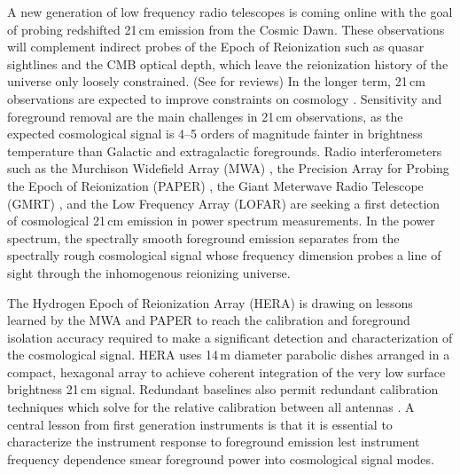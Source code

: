 A new generation of low frequency radio telescopes is coming online with the goal of
 probing redshifted 21\,cm emission from the Cosmic Dawn. These observations will 
 complement indirect probes of the Epoch of Reionization such as quasar 
 sightlines and the CMB optical depth, which leave the reionization 
 history of the universe only loosely constrained. (See \citet{FurlanettoReview, miguelreview, PritchardLoebReview, aviBook, zaroubi} for reviews) In the longer term, 21\,cm observations are expected to improve constraints on cosmology \citep[e.g.,][]{mao08, liu15a,liu15b}. Sensitivity and foreground removal are 
 the main challenges in 21\,cm observations, as the expected cosmological signal is 4--5 
 orders of magnitude fainter in brightness temperature than Galactic and extragalactic foregrounds. Radio 
 interferometers such as the Murchison Widefield Array (MWA) \citep{lonsdale09,tingay13,mwascience}, the Precision Array for Probing the Epoch of Reionization (PAPER) \citep{parsons10,parsons14,ali15}, the Giant Meterwave Radio Telescope (GMRT) 
 \citep{Paciga2011}, and the Low Frequency Array (LOFAR) \citep{lofar} are seeking a first detection of 
 cosmological 21\,cm emission in power spectrum measurements. In the power spectrum, the spectrally smooth foreground emission separates from the spectrally 
 rough cosmological signal whose frequency dimension probes a line of sight through the 
 inhomogenous reionizing universe.


The Hydrogen Epoch of Reionization Array (HERA) \citep{PoberNextGen,deboer16} is drawing on lessons learned by the MWA and PAPER to reach the calibration and foreground isolation accuracy required to make a significant detection and characterization of the cosmological signal. HERA uses 14\,m diameter parabolic dishes arranged in a compact, hexagonal array to achieve coherent integration of the very low surface brightness 21\,cm signal. Redundant baselines also permit redundant calibration techniques which solve for the relative calibration between all antennas \citep{redundant3, redundant4, liu10,zheng14}. A central lesson from first generation instruments is that it is essential to characterize the instrument response to foreground emission lest instrument frequency dependence smear foreground power into cosmological signal modes. 


